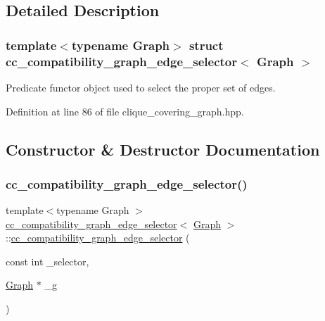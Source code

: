 \subsection{Detailed Description}
\subsubsection*{template$<$typename Graph$>$\newline
struct cc\+\_\+compatibility\+\_\+graph\+\_\+edge\+\_\+selector$<$ Graph $>$}

Predicate functor object used to select the proper set of edges. 

Definition at line 86 of file clique\+\_\+covering\+\_\+graph.\+hpp.



\subsection{Constructor \& Destructor Documentation}
\mbox{\label{structcc__compatibility__graph__edge__selector_af34c1bcbf2c4c00e91c295d1c53b2cab}} 
\subsubsection{\texorpdfstring{cc\+\_\+compatibility\+\_\+graph\+\_\+edge\+\_\+selector()}{cc\_compatibility\_graph\_edge\_selector()}\hspace{0.1cm}{\footnotesize\ttfamily [1/2]}}
{\footnotesize\ttfamily template$<$typename Graph $>$ \\
\hyperlink{structcc__compatibility__graph__edge__selector}{cc\+\_\+compatibility\+\_\+graph\+\_\+edge\+\_\+selector}$<$ \hyperlink{structGraph}{Graph} $>$\+::\hyperlink{structcc__compatibility__graph__edge__selector}{cc\+\_\+compatibility\+\_\+graph\+\_\+edge\+\_\+selector} (\begin{DoxyParamCaption}\item[{const int}]{\+\_\+selector,  }\item[{\hyperlink{structGraph}{Graph} $\ast$}]{\+\_\+g }\end{DoxyParamCaption})\hspace{0.3cm}{\ttfamily [inline]}}



